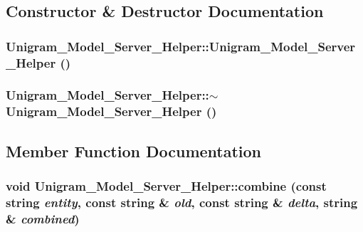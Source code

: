 \subsection{Constructor \& Destructor Documentation}
\hypertarget{class_unigram___model___server___helper_a9058237cc4b9b1cdda07b8c0aff5cb4d}{
\subsubsection[{Unigram\_\-Model\_\-Server\_\-Helper}]{\setlength{\rightskip}{0pt plus 5cm}Unigram\_\-Model\_\-Server\_\-Helper::Unigram\_\-Model\_\-Server\_\-Helper ()}}
\label{class_unigram___model___server___helper_a9058237cc4b9b1cdda07b8c0aff5cb4d}
\hypertarget{class_unigram___model___server___helper_ac8061cb3d7f6e4965c8d718e25356a63}{
\subsubsection[{$\sim$Unigram\_\-Model\_\-Server\_\-Helper}]{\setlength{\rightskip}{0pt plus 5cm}Unigram\_\-Model\_\-Server\_\-Helper::$\sim$Unigram\_\-Model\_\-Server\_\-Helper ()}}
\label{class_unigram___model___server___helper_ac8061cb3d7f6e4965c8d718e25356a63}


\subsection{Member Function Documentation}
\hypertarget{class_unigram___model___server___helper_a44b942cb380cbb1207bc994ac14a368c}{
\subsubsection[{combine}]{\setlength{\rightskip}{0pt plus 5cm}void Unigram\_\-Model\_\-Server\_\-Helper::combine (const string {\em entity}, \/  const string \& {\em old}, \/  const string \& {\em delta}, \/  string \& {\em combined})}}
\label{class_unigram___model___server___helper_a44b942cb380cbb1207bc994ac14a368c}


